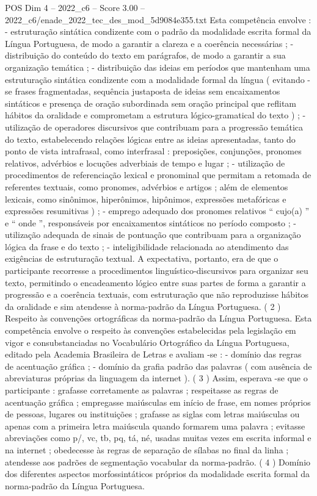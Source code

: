 \begin{textsample}{POS Dim 4 – 2022\_c6 – Score 3.00 – 2022\_c6/enade\_2022\_tec\_des\_mod\_5d9084e355.txt}
Esta competência envolve : - estruturação sintática condizente com o padrão da modalidade escrita formal da Língua Portuguesa, de modo a garantir a clareza e a coerência necessárias ; - distribuição do conteúdo do texto em parágrafos, de modo a garantir a sua organização temática ; - distribuição das ideias em períodos que mantenham uma estruturação sintática condizente com a modalidade formal da língua ( evitando -se frases fragmentadas, sequência justaposta de ideias sem encaixamentos sintáticos e presença de oração subordinada sem oração principal que reflitam hábitos da oralidade e comprometam a estrutura lógico-gramatical do texto ) ; - utilização de operadores discursivos que contribuam para a progressão temática do texto, estabelecendo relações lógicas entre as ideias apresentadas, tanto do ponto de vista intrafrasal, como interfrasal : preposições, conjunções, pronomes relativos, advérbios e locuções adverbiais de tempo e lugar ; - utilização de procedimentos de referenciação lexical e pronominal que permitam a retomada de referentes textuais, como pronomes, advérbios e artigos ; além de elementos lexicais, como sinônimos, hiperônimos, hipônimos, expressões metafóricas e expressões resumitivas ) ; - emprego adequado dos pronomes relativos “ cujo(a) ” e “ onde ”, responsáveis por encaixamentos sintáticos no período composto ; - utilização adequada de sinais de pontuação que contribuam para a organização lógica da frase e do texto ; - inteligibilidade relacionada ao atendimento das exigências de estruturação textual.
A expectativa, portanto, era de que o participante recorresse a procedimentos linguístico-discursivos para organizar seu texto, permitindo o encadeamento lógico entre suas partes de forma a garantir a progressão e a coerência textuais, com estruturação que não reproduzisse hábitos da oralidade e sim atendesse à norma-padrão da Língua Portuguesa. ( 2 ) Respeito às convenções ortográficas da norma-padrão da Língua Portuguesa.
Esta competência envolve o respeito às convenções estabelecidas pela legislação em vigor e consubstanciadas no Vocabulário Ortográfico da Língua Portuguesa, editado pela Academia Brasileira de Letras e avaliam -se : - domínio das regras de acentuação gráfica ; - domínio da grafia padrão das palavras ( com ausência de abreviaturas próprias da linguagem da internet ). ( 3 ) Assim, esperava -se que o participante : grafasse corretamente as palavras ; respeitasse as regras de acentuação gráfica ; empregasse maiúsculas em início de frase, em nomes próprios de pessoas, lugares ou instituições ; grafasse as siglas com letras maiúsculas ou apenas com a primeira letra maiúscula quando formarem uma palavra ; evitasse abreviações como p/, vc, tb, pq, tá, né, usadas muitas vezes em escrita informal e na internet ; obedecesse às regras de separação de sílabas no final da linha ; atendesse aos padrões de segmentação vocabular da norma-padrão. ( 4 ) Domínio dos diferentes aspectos morfossintáticos próprios da modalidade escrita formal da norma-padrão da Língua Portuguesa.

\end{textsample}
